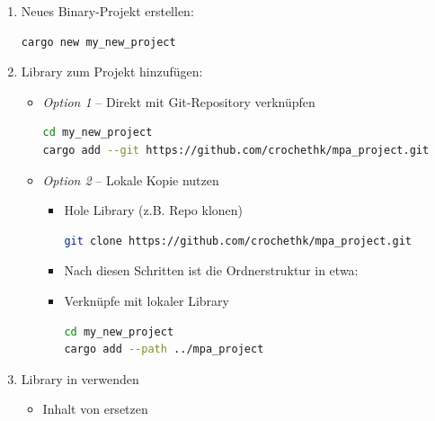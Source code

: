 \begin{enumerate}
    \item Neues Binary-Projekt erstellen:

\begin{lstlisting}[language=bash]
cargo new my_new_project
\end{lstlisting}

    \item Library zum Projekt hinzufügen:
    \begin{itemize}
        \item \textit{Option 1} -- Direkt mit Git-Repository verknüpfen

\begin{lstlisting}[language=bash]
cd my_new_project
cargo add --git https://github.com/crochethk/mpa_project.git
\end{lstlisting}

        \item \textit{Option 2} -- Lokale Kopie nutzen
        \begin{itemize}
            \item Hole Library (z.B. Repo klonen)

\begin{lstlisting}[language=bash]
git clone https://github.com/crochethk/mpa_project.git
\end{lstlisting}

            \item Nach diesen Schritten ist die Ordnerstruktur in etwa: \\
                \begin{minipage}{10cm}
                \end{minipage}

            \item Verknüpfe mit lokaler Library

\begin{lstlisting}[language=bash]
cd my_new_project
cargo add --path ../mpa_project
\end{lstlisting}

        \end{itemize}
    \end{itemize}

    \item Library in  verwenden
    \begin{itemize}
        \item Inhalt von  ersetzen


\end{itemize}
\end{enumerate}
